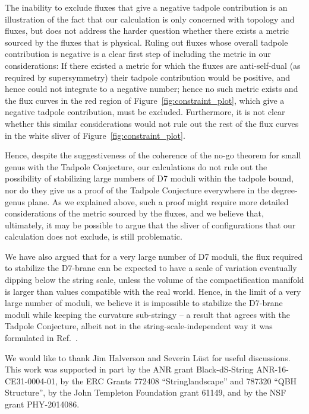 \documentclass[a4paper,12pt]{article}
\numberwithin{equation}{section}
\begin{document}
The inability to exclude fluxes that give a negative tadpole contribution is an illustration of the fact that our calculation is only concerned with topology and fluxes, but does not address the harder question whether there exists a metric sourced by the fluxes that is physical. Ruling out fluxes whose overall tadpole contribution is negative is a clear first step of including the metric in our considerations: If there existed a metric for which the fluxes are anti-self-dual (as required by supersymmetry) their tadpole contribution would be positive, and hence could not integrate to a negative number; hence no such metric exists and the flux curves in the red region of Figure~\ref{fig:constraint_plot}, which give a negative tadpole contribution, must be excluded. Furthermore, it is not clear whether this similar considerations would not rule out the rest of the flux curves in the white sliver of Figure~\ref{fig:constraint_plot}.

Hence, despite the suggestiveness of the coherence of the no-go theorem for small genus with the Tadpole Conjecture, our calculations do not rule out the possibility of stabilizing large numbers of D7 moduli within the tadpole bound, nor do they give us a proof of the Tadpole Conjecture everywhere in the degree-genus plane. As we explained above, such a proof might require more detailed considerations of the metric sourced by the fluxes, and we believe that, ultimately, it may be possible to argue that the sliver of configurations that our calculation does not exclude, is still problematic. 

We have also argued that for a very large number of D7 moduli, the flux required to stabilize the D7-brane can be expected to have a scale of variation eventually dipping below the string scale, unless the volume of the compactification manifold is larger than values compatible with the real world. Hence, in the  limit of a very large number of moduli, we believe it is impossible to stabilize the D7-brane moduli while keeping the curvature sub-stringy -- a result that agrees with the Tadpole Conjecture, albeit not in the string-scale-independent way it was formulated in Ref.~\cite{Bena:2020xrh}.
 

\medskip


\vspace{0.6cm}
 We would like to thank Jim Halverson and Severin L\"ust for useful discussions. This work was supported in part by the ANR grant Black-dS-String ANR-16-CE31-0004-01, by the ERC Grants 772408 ``Stringlandscape'' and 787320 ``QBH Structure'', by the John Templeton Foundation grant 61149, and by the NSF grant PHY-2014086.
\end{document}
